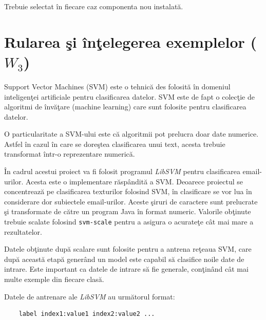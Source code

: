 \documentclass[a4paper,12pt]{report}
\begin{document}
  Trebuie selectat \^in fiecare caz componenta nou instalat\u a.
  

  
  
  
  



\chapter{Rularea \c si \^in\c telegerea exemplelor ($W_3$)}

  \par
  Support Vector Machines (SVM) este o tehnic\u a des folosit\u a \^in domeniul inteligen\c tei artificiale
  pentru clasificarea datelor. SVM este de fapt o colec\c tie de algoritmi de \^inv\u a\c tare
  (machine learning) care sunt folosite pentru clasificarea datelor.
  
  \par
  O particularitate a SVM-ului este c\u a algoritmii pot prelucra doar date numerice. Astfel \^in cazul \^in care
  se dore\c stea clasificarea unui text, acesta trebuie transformat \^intr-o reprezentare numeric\u a.
  
  \par
  \^In cadrul acestui proiect va fi folosit programul \textit{LibSVM} pentru clasificarea email-urilor. 
  Acesta este o implementare r\u asp\^andit\u a a SVM.
  Deoarece proiectul se concentreaz\u a pe clasificarea texturilor folosind SVM, \^in clasificare se vor
  lua \^in considerare dor subiectele email-urilor. Aceste \c siruri de caractere sunt prelucrate \c si transformate
  de c\u atre un program Java \^in format numeric. Valorile ob\c tinute trebuie scalate folosind \verb+svm-scale+
  pentru a asigura o acurate\c te c\^ at mai mare a rezultatelor.
  
  \par 
  Datele ob\c tinute dup\u a scalare sunt folosite pentru a antrena re\c teaua SVM, care dup\u a aceast\u a 
  etap\u a gener\^and un model este capabil s\u a clasifice noile date de intrare. Este important ca datele de
  intrare s\u a fie generale, con\c tin\^and c\^at mai multe exemple din fiecare clas\u a.
  
  \par
  Datele de antrenare ale \textit{LibSVM} au urm\u atorul format:
  
  \begin{verbatim}
    label index1:value1 index2:value2 ...
  \end{verbatim}
  
\end{document}
